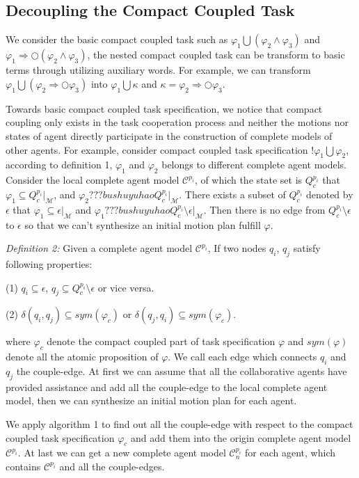 \documentclass[journal]{IEEEtran}
\begin{document}
\subsection{Decoupling the Compact Coupled Task}
We consider the basic compact coupled task such as $\varphi_1 \bigcup (\varphi_2 \wedge \varphi_3)$ and $\varphi_1 \Longrightarrow \bigcirc(\varphi_2 \wedge \varphi_3)$, the nested compact coupled task can be transform to basic terms through utilizing auxiliary words. For example, we can transform $\varphi_1 \bigcup (\varphi_2 \Longrightarrow \bigcirc \varphi_3)$ into $\varphi_1 \bigcup \kappa$ and $\kappa=\varphi_2 \Longrightarrow \bigcirc \varphi_3$.
\par
Towards basic compact coupled task specification, we notice that compact coupling only exists in the task cooperation process and neither the motions nor states of agent directly participate in the construction of complete models of other agents. For example, consider compact coupled task specification $!\varphi_1\bigcup\varphi_2$, according to definition 1, $\varphi_1$ and $\varphi_2$ belongs to different complete agent models. Consider the local complete agent model $\mathcal{C}^{p_i}$, of which the state set is $Q_c^{p_i}$ that $\varphi_1 \subseteq Q_c^{p_i}|_{\mathcal{M}}$, and $\varphi_2 ??? bushuyuhao Q_c^{p_i}|_{\mathcal{M}} $. There exists a subset of $Q_c^{p_i}$ denoted by $\epsilon$ that $\varphi_1 \subseteq \epsilon |_{\mathcal{M}}$ and $\varphi_1 ???bushuyuhao Q_c^{p_i} \setminus \epsilon |_{\mathcal{M}}$. Then there is no edge from $Q_c^{p_i} \setminus \epsilon$ to $\epsilon$ so that we can't synthesize an initial motion plan fulfill $\varphi$.\par
\emph{Definition 2:} Given a complete agent model $\mathcal{C}^{p_i}$, If two nodes $q_i$, $q_j$ satisfy following properties:
\par
(1) $q_i \subseteq \epsilon$, $q_j \subseteq Q_c^{p_i} \setminus \epsilon$ or vice versa.\par
(2) $\delta(q_i,q_j)\subseteq sym(\varphi_c)$ or $\delta(q_j,q_i)\subseteq sym(\varphi_c)$.\par
where $\varphi_c$ denote the compact coupled part of task specification $\varphi$ and $sym(\varphi)$ denote all the atomic proposition of $\varphi$.
We call each edge which connects $q_i$ and $q_j$ the couple-edge.
At first we can assume that all the collaborative agents have provided assistance and add all the couple-edge to the local complete agent model, then we can synthesize an initial motion plan for each agent.\par
We apply algorithm 1 to find out all the couple-edge with respect to the compact coupled task specification $\varphi_c$ and add them into the origin complete agent model $\mathcal{C}^{p_i}$. At last we can get a new complete agent model $\mathcal{C}^{p_i}_n$ for each agent, which contains $\mathcal{C}^{p_i}$ and all the couple-edges.\par
\end{document}
